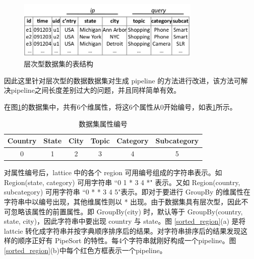 \begin{figure}[!htb]
\centering\includegraphics[width=3.5in]{picture/ch_datacube_mr/dataset_table} 
\caption{层次型数据集的表结构}\label{dataset_table1} 
\end{figure} 

因此这里针对层次型的数据数据集对生成 pipeline 的方法进行改进，该方法可解决pipeline之间长度差别过大的问题，并且同样简单有效。



在图\ref{dataset_table1}的数据集中，共有6个维属性，将这6个属性从0开始编号，如表\ref{attribute_no}所示。

\begin{table}[!htb]
\begin{center}
\begin{tabular}{|c|c|c|c|c|c|}
\hline 
Country & State & City & Topic & Category & Subcategory \\ 
\hline 
0 & 1 & 2 & 3 & 4 & 5 \\ 
\hline 
\end{tabular} 
\end{center}
\caption{数据集属性编号}\label{attribute_no}
\end{table}

对属性编号后，lattice 中的各个 region 可用编号组成的字符串表示。如 Region(state, category) 可用字符串 ``0 1 * 3 4 *" 表示。又如 Region(country, subcategory) 可用字符串 ``0 * * 3 4 5"表示。即对于要进行 GroupBy 的维属性在字符串中以编号出现，其他维属性则以 * 出现。由于数据集具有层次型，因此不可忽略该属性的前置属性。即 GroupBy(city) 时，默认等于 GroupBy(country, state, city)，因此字符串中要出现 country 与 state。图 \ref{sorted_region}(a) 是将 lattcie 转化成字符串并按字典顺序排序后的结果。对字符串排序后的结果发现这样的顺序正好有 PipeSort 的特性。每4个字符串就刚好构成一个pipeline。图\ref{sorted_region}(b)中每个红色方框表示一个pipeline。


